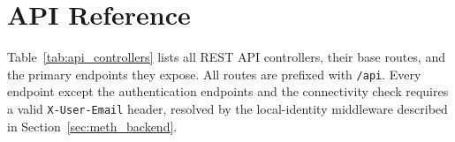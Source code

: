 ﻿\appendix
\renewcommand{\appendixtocname}{Appendix}
\renewcommand{\appendixpagename}{\appendixtocname}
\addappheadtotoc
\appendixpage

\chapter{API Reference}\label{app:api}

Table~\ref{tab:api_controllers} lists all REST API controllers, their base routes,
and the primary endpoints they expose.
All routes are prefixed with \texttt{/api}.
Every endpoint except the authentication endpoints and the connectivity check requires
a valid \texttt{X-User-Email} header, resolved by the local-identity middleware
described in Section~\ref{sec:meth_backend}.

